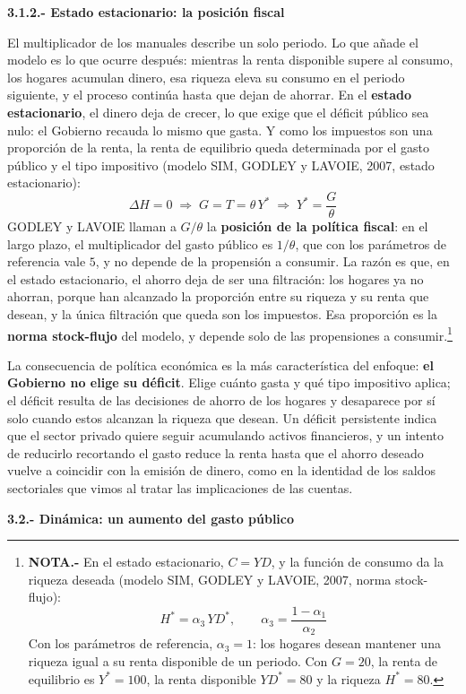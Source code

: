 \documentclass[10pt,a4paper]{article}
\begin{document}
\textbf{3.1.2.- Estado estacionario: la posición fiscal}

El multiplicador de los manuales describe un solo periodo. Lo que añade el modelo es lo que ocurre después: mientras la renta disponible supere al consumo, los hogares acumulan dinero, esa riqueza eleva su consumo en el periodo siguiente, y el proceso continúa hasta que dejan de ahorrar. En el \textbf{estado estacionario}, el dinero deja de crecer, lo que exige que el déficit público sea nulo: el Gobierno recauda lo mismo que gasta. Y como los impuestos son una proporción de la renta, la renta de equilibrio queda determinada por el gasto público y el tipo impositivo (modelo SIM, GODLEY y LAVOIE, 2007, estado estacionario):
$$\Delta H=0\;\Rightarrow\;G=T=\theta\,Y^{*}\;\Rightarrow\;Y^{*}=\frac{G}{\theta}$$
GODLEY y LAVOIE llaman a $G/\theta$ la \textbf{posición de la política fiscal}: en el largo plazo, el multiplicador del gasto público es $1/\theta$, que con los parámetros de referencia vale $5$, y no depende de la propensión a consumir. La razón es que, en el estado estacionario, el ahorro deja de ser una filtración: los hogares ya no ahorran, porque han alcanzado la proporción entre su riqueza y su renta que desean, y la única filtración que queda son los impuestos. Esa proporción es la \textbf{norma stock-flujo} del modelo, y depende solo de las propensiones a consumir.\footnote{%
    \textbf{NOTA.-} En el estado estacionario, $C=YD$, y la función de consumo da la riqueza deseada (modelo SIM, GODLEY y LAVOIE, 2007, norma stock-flujo):
    $$H^{*}=\alpha_3\,YD^{*},\qquad \alpha_3=\frac{1-\alpha_1}{\alpha_2}$$
    Con los parámetros de referencia, $\alpha_3=1$: los hogares desean mantener una riqueza igual a su renta disponible de un periodo. Con $G=20$, la renta de equilibrio es $Y^{*}=100$, la renta disponible $YD^{*}=80$ y la riqueza $H^{*}=80$.
}

La consecuencia de política económica es la más característica del enfoque: \textbf{el Gobierno no elige su déficit}. Elige cuánto gasta y qué tipo impositivo aplica; el déficit resulta de las decisiones de ahorro de los hogares y desaparece por sí solo cuando estos alcanzan la riqueza que desean. Un déficit persistente indica que el sector privado quiere seguir acumulando activos financieros, y un intento de reducirlo recortando el gasto reduce la renta hasta que el ahorro deseado vuelve a coincidir con la emisión de dinero, como en la identidad de los saldos sectoriales que vimos al tratar las implicaciones de las cuentas.

\textbf{3.2.- Dinámica: un aumento del gasto público}
\end{document}
